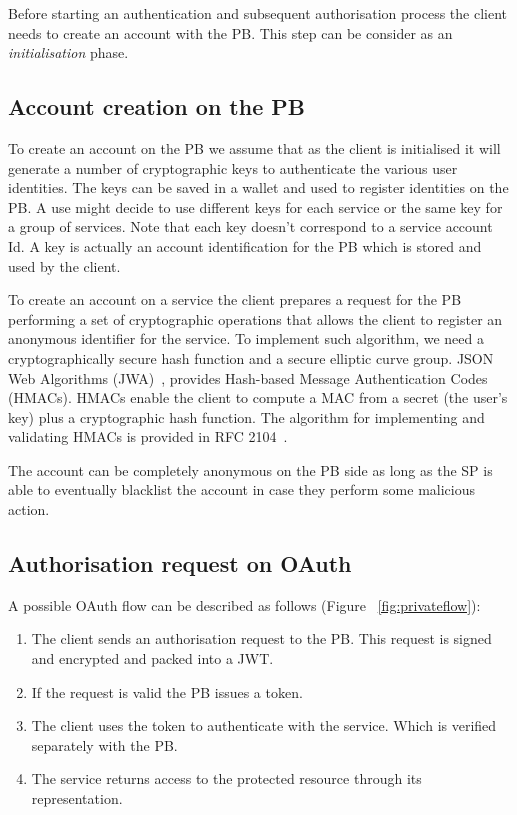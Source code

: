 Before starting an authentication and subsequent authorisation process the client needs to create an account with the PB. This step can be consider as an \emph{initialisation} phase.

\subsection{Account creation on the PB}

To create an account on the PB we assume that as the client is initialised it will generate a number of cryptographic keys to authenticate the various user identities. The keys can be saved in a wallet and used to register identities on the PB. A use might decide to use different keys for each service or the same key for a group of services. Note that each key doesn't correspond to a service account Id. A key is actually an account identification for the PB which is stored and used by the client.

To create an account on a service the client prepares a request for the PB performing a set of cryptographic operations that allows the client to register an anonymous identifier for the service. To implement such algorithm, we need a
cryptographically secure hash function and a secure elliptic curve group. JSON Web Algorithms (JWA)~\cite{jones2015jwa}, provides Hash-based Message Authentication Codes (HMACs). HMACs enable the client to compute a MAC from a secret (the user's key) plus a cryptographic hash function. The algorithm for implementing and validating HMACs is provided in RFC 2104~\cite{krawczyk1997rfc}.

The account can be completely anonymous on the PB side as long as the SP is able to eventually blacklist the account in case they perform some malicious action.

\subsection{Authorisation request on OAuth}

A possible OAuth flow can be described as follows (Figure ~\ref{fig:privateflow}):
\begin{enumerate}
    \item The client sends an authorisation request to the PB. This request is signed and encrypted and packed into a JWT.
    \item If the request is valid the PB issues a token.
    \item The client uses the token to authenticate with the service. Which is verified separately with the PB.
    \item The service returns access to the protected resource through its representation.
\end{enumerate}

